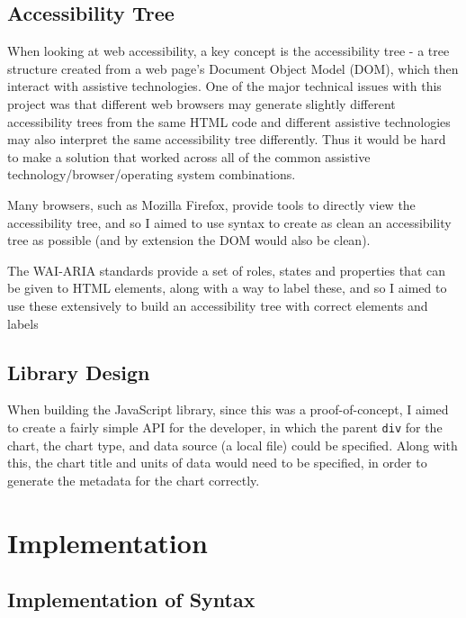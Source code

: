 \documentclass[ %
                    author={Aleena Baig},
                supervisor={Dr Simon Lock},
                    degree={BSc},
                     title={On Making Web Accessible Graphs},
                  subtitle={},
                      year={2019} ]{dissertation}
\begin{document}
\section{Accessibility Tree}

When looking at web accessibility, a key concept is the accessibility tree - a tree structure created from a web page's Document Object Model (DOM), which then interact with assistive technologies. One of the major technical issues with this project was that different web browsers may generate slightly different accessibility trees from the same HTML code and different assistive technologies may also interpret the same accessibility tree differently. Thus it would be hard to make a solution that worked across all of the common assistive technology/browser/operating system combinations.


Many browsers, such as Mozilla Firefox, provide tools to directly view the accessibility tree, and so I aimed to use syntax to create as clean an accessibility tree as possible (and by extension the DOM would also be clean).

The WAI-ARIA standards provide a set of roles, states and properties that can be given to HTML elements, along with a way to label these, and so I aimed to use these extensively to build an accessibility tree with correct elements and labels

\section{Library Design}

When building the JavaScript library, since this was a proof-of-concept, I aimed to create a fairly simple API for the developer, in which the parent \texttt{div} for the chart, the chart type, and data source (a local file) could be specified. Along with this, the chart title and units of data would need to be specified, in order to generate the metadata for the chart correctly.

\chapter{Implementation}

\section{Implementation of Syntax}
\end{document}
